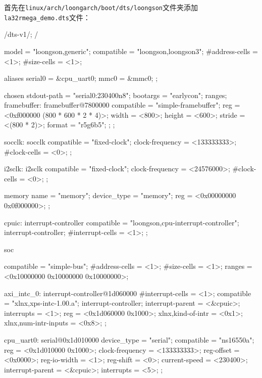 首先在\texttt{linux/arch/loongarch/boot/dts/loongson}文件夹添加\texttt{la32rmega\_demo.dts}文件：

\begin{CodeBlock}[language=BookDTS]
/dts-v1/;
/{
    model = "loongson,generic";
    compatible = "loongson,loongson3";
    #address-cells = <1>;
    #size-cells = <1>;

    aliases {
        serial0 = &cpu_uart0;
        mmc0 = &mmc0;
    };

    chosen {
        stdout-path = "serial0:230400n8";
        bootargs = "earlycon";
        ranges;
        framebuffer: framebuffer@7800000 {
            compatible = "simple-framebuffer";
            reg = <0xf000000 (800 * 600 * 2 * 4)>;
            width = <800>;
            height = <600>;
            stride = <(800 * 2)>;
            format = "r5g6b5";
        }; 
    };

    socclk: socclk {
        compatible = "fixed-clock";
        clock-frequency = <133333333>;
        #clock-cells = <0>;
    };

    i2sclk: i2sclk {
        compatible = "fixed-clock";
        clock-frequency = <24576000>;
        #clock-cells = <0>;
    };

    memory {
        name = "memory";
        device_type = "memory";
        reg =  <0x00000000  0x0f000000>;
    };

    cpuic: interrupt-controller {
        compatible = "loongson,cpu-interrupt-controller";
        interrupt-controller;
        #interrupt-cells = <1>;
    };

    soc {
        compatible = "simple-bus";
        #address-cells = <1>;
        #size-cells = <1>;
        ranges = <0x10000000 0x10000000 0x10000000>;

        axi_intc_0: interrupt-controller@1d060000 {
                #interrupt-cells = <1>;
                compatible = "xlnx,xps-intc-1.00.a";
                interrupt-controller;
                interrupt-parent = <&cpuic>;
                interrupts = <1>;
                reg = <0x1d060000 0x1000>;
                xlnx,kind-of-intr = <0x1>;
                xlnx,num-intr-inputs = <0x8>;
        };

        cpu_uart0: serial@0x1d010000 {
            device_type = "serial";
            compatible = "ns16550a";
            reg = <0x1d010000 0x1000>;
            clock-frequency = <133333333>;
            reg-offset = <0x0000>;
            reg-io-width = <1>;
            reg-shift = <0>;
            current-speed = <230400>;
            interrupt-parent = <&cpuic>;
            interrupts = <5>;
        };

}}
\end{CodeBlock}
